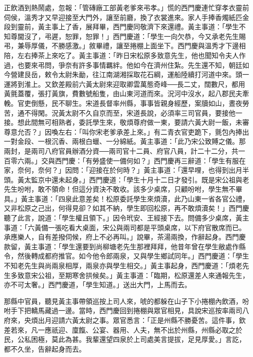 正飲酒到熱鬧處，忽報：「管磚廠工部黃老爹來弔孝。」慌的西門慶連忙穿孝衣靈前伺侯，溫秀才又早迎接至大門外，讓至前廳，換了衣裳進來。家人手捧香燭紙匹金段到靈前，黃主事上了香，展拜畢，西門慶同敬濟下來還禮。黃主事道：「學生不知尊閫沒了，弔遲，恕罪，恕罪！」西門慶道：「學生一向欠恭，今又承老先生賜弔，兼辱厚儀，不勝感激。」敘畢禮，讓至捲棚上面坐下。西門慶與溫秀才下邊相陪，左右捧茶上來吃了。黃主事道：「昨日宋松原多致意先生，他也聞知令夫人作過，也要來弔問，爭奈有許多事情羈絆。他如今在濟州住紮。先生還不知，朝廷如今營建艮岳，敕令太尉朱勔，往江南湖湘採取花石綱，運船陸續打河道中來。頭一運將到淮上。又欽差殿前六黃太尉來迎取卿雲萬態奇峰──長二丈，闊數尺，都用黃氈蓋覆，張打黃旗，費數號船隻，由山東河道而來。況河中沒水，起八郡民夫牽輓。官吏倒懸，民不聊生。宋道長督率州縣，事事皆親身經歷，案牘如山，晝夜勞苦，通不得閑。況黃太尉不久自京而至，宋道長說，必須率三司官員，要接他一接。想此間無可相熟者，委託學生來，敬煩尊府做一東，要請六黃大尉一飯，未審尊意允否？」因喚左右：「叫你宋老爹承差上來。」有二青衣官吏跪下，氈包內捧出一對金段、一根沉香、兩根白蠟、一分綿紙。黃主事道：「此乃宋公致賻之儀。那兩封，是兩司八府官員辦酒分資──兩司官十二員、府官八員，計二十二分，共一百零六兩。」交與西門慶：「有勞盛使一備何如？」西門慶再三辭道：「學生有服在家，奈何，奈何？」因問：「迎接在於何時？」黃主事道：「還早哩，也得到出月半頭。黃太監京中還未起身。」西門慶道：「學生十月十二日才發引。既是宋公祖與老先生吩咐，敢不領命！但這分資決不敢收。該多少桌席，只顧吩咐，學生無不畢具。」黃主事道：「四泉此意差矣！松原委託學生來煩瀆，此乃山東一省各官公禮，又非松原之己出，何得見卻？如其不納，學生即回松原，再不敢煩瀆矣！」西門慶聽了此言，說道：「學生權且領下。」因令玳安、王經接下去。問備多少桌席，黃主事道：「六黃備一張吃看大桌面，宋公與兩司都是平頭桌席，以下府官散席而已。承應樂人，自有差撥伺候，府上不必再叫。」說畢，茶湯兩換，作辭起身。西門慶款留，黃主事道：「學生還要到尚柳塘老先生那裡拜拜，他昔年曾在學生敝處作縣令，然後轉成都府推官。如今他令郎兩泉，又與學生鄉試同年。」西門慶道：「學生不知老先生與尚兩泉相厚，兩泉亦與學生相交。」黃主事起身，西門慶道：「煩老先生多致意宋公祖，至期寒舍拱候矣。」黃主事道：「臨期，松原還差人來通報先生，亦不可太奢。」西門慶道，「學生知道。」送出大門，上馬而去。

那縣中官員，聽見黃主事帶領巡按上司人來，唬的都躲在山子下小捲棚內飲酒，吩咐手下把轎馬藏過一邊。當時，西門慶回到捲棚與眾官相見，具說宋巡按率兩司八府來，央煩出月迎請六黃太尉之事。眾官悉言：「正是州縣不勝憂苦。這件事，欽差若來，凡一應祇迎、廩餼、公宴、器用、人夫，無不出於州縣，州縣必取之於民，公私困極，莫此為甚。我輩還望四泉於上司處美言提拔，足見厚愛。」言訖，都不久坐，告辭起身而去。

